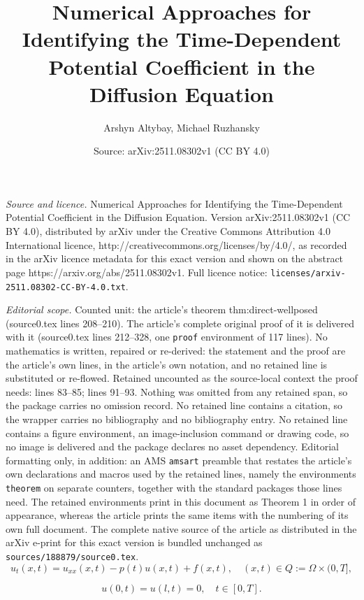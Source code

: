 \documentclass[10pt,a4paper]{amsart}
\title{Numerical Approaches for Identifying the Time-Dependent Potential Coefficient in the Diffusion Equation}
\author{Arshyn Altybay, Michael Ruzhansky}
\date{Source: arXiv:2511.08302v1 (CC BY 4.0)}
\begin{document}
\maketitle

\noindent\emph{Source and licence.} Numerical Approaches for Identifying the Time-Dependent Potential Coefficient in the Diffusion Equation. Version arXiv:2511.08302v1 (CC BY 4.0), distributed by arXiv under the Creative Commons Attribution 4.0 International licence, http://creativecommons.org/licenses/by/4.0/, as recorded in the arXiv licence metadata for this exact version and shown on the abstract page https://arxiv.org/abs/2511.08302v1. Full licence notice: \texttt{licenses/arxiv-2511.08302-CC-BY-4.0.txt}.\par\smallskip

\noindent\textit{Editorial scope.} Counted unit: the article's theorem thm:direct-wellposed (source0.tex lines 208--210). The article's complete original proof of it is delivered with it (source0.tex lines 212--328, one \texttt{proof} environment of 117 lines). No mathematics is written, repaired or re-derived: the statement and the proof are the article's own lines, in the article's own notation, and no retained line is substituted or re-flowed.  Retained uncounted as the source-local context the proof needs: lines 83--85; lines 91--93.  Nothing was omitted from any retained span, so the package carries no omission record.  No retained line contains a citation, so the wrapper carries no bibliography and no bibliography entry.  No retained line contains a figure environment, an image-inclusion command or drawing code, so no image is delivered and the package declares no asset dependency.  Editorial formatting only, in addition: an AMS \texttt{amsart} preamble that restates the article's own declarations and macros used by the retained lines, namely the environments \texttt{theorem} on separate counters, together with the standard packages those lines need.  The retained environments print in this document as Theorem 1 in order of appearance, whereas the article prints the same items with the numbering of its own full document.  The complete native source of the article as distributed in the arXiv e-print for this exact version is bundled unchanged as \texttt{sources/188879/source0.tex}.
\begin{equation} \label{1.1}
    u_t(x,t) = u_{xx}(x,t) - p(t)u(x,t) + f(x,t), \quad (x,t) \in Q := \Omega \times (0,T],
\end{equation}

\begin{equation} \label{1.3}
    u(0,t) = u(l,t) = 0, \quad t \in [0,T].
\end{equation}
\end{document}
